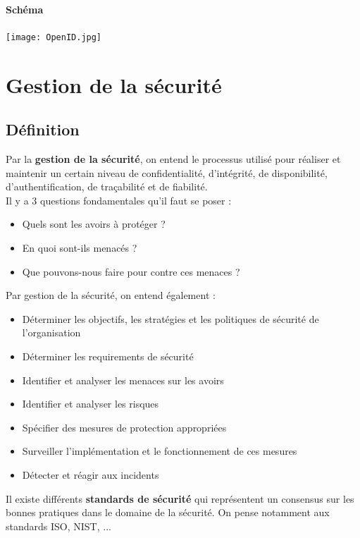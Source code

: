 \documentclass{report}
\begin{document}
\subsubsection{Schéma}

\texttt{[image: OpenID.jpg]}

\chapter{Gestion de la sécurité}

\section{Définition}

Par la \textbf{gestion de la sécurité}, on entend le processus utilisé pour réaliser et maintenir un certain niveau de confidentialité, d'intégrité, de disponibilité, d'authentification, de traçabilité et de fiabilité.\\

Il y a 3 questions fondamentales qu'il faut se poser :
\begin{itemize}
    \item Quels sont les avoirs à protéger ?
    \item En quoi sont-ils menacés ?
    \item Que pouvons-nous faire pour contre ces menaces ?
\end{itemize}

Par gestion de la sécurité, on entend également :
\begin{itemize}
    \item Déterminer les objectifs, les stratégies et les politiques de sécurité de l'organisation
    \item Déterminer les requirements de sécurité
    \item Identifier et analyser les menaces sur les avoirs
    \item Identifier et analyser les risques
    \item Spécifier des mesures de protection appropriées
    \item Surveiller l'implémentation et le fonctionnement de ces mesures
    \item Détecter et réagir aux incidents
\end{itemize}

Il existe différents \textbf{standards de sécurité} qui représentent un consensus sur les bonnes pratiques dans le domaine de la sécurité. On pense notamment aux standards ISO, NIST, ...\\
\end{document}
